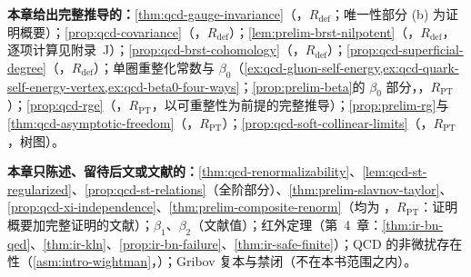 \begin{tcolorbox}[enhanced,breakable,title=本章证明了什么／没有证明什么,fonttitle=\bfseries,
  colback=gray!3!white,colframe=gray!55!black,boxrule=0.6pt,arc=2pt,
  left=5pt,right=5pt,top=3pt,bottom=3pt,before skip=6pt,after skip=6pt]
\textbf{本章给出完整推导的：}\cref{thm:qcd-gauge-invariance}（\tagR，$R_{\mathrm{def}}$；唯一性部分 (b) 为证明概要）；\cref{prop:qcd-covariance}（\tagR，$R_{\mathrm{def}}$）；\cref{lem:prelim-brst-nilpotent}（\tagR，$R_{\mathrm{def}}$，逐项计算见附录~J）；\cref{prop:qcd-brst-cohomology}（\tagR，$R_{\mathrm{def}}$）；\cref{prop:qcd-superficial-degree}（\tagR，$R_{\mathrm{def}}$）；单圈重整化常数与 $\beta_0$（\cref{ex:qcd-gluon-self-energy,ex:qcd-quark-self-energy-vertex,ex:qcd-beta0-four-ways}；\cref{prop:prelim-beta}的 $\beta_0$ 部分，\tagR，$R_{\mathrm{PT}}$）；\cref{prop:qcd-rge}（\tagR，$R_{\mathrm{PT}}$，以可重整性为前提的完整推导）；\cref{prop:prelim-rg}与\cref{thm:qcd-asymptotic-freedom}（\tagR，$R_{\mathrm{PT}}$）；\cref{prop:qcd-soft-collinear-limits}（\tagR，$R_{\mathrm{PT}}$，树图）。\par
\textbf{本章只陈述、留待后文或文献的：}\cref{thm:qcd-renormalizability}、\cref{lem:qcd-st-regularized}、\cref{prop:qcd-st-relations}（全阶部分）、\cref{thm:prelim-slavnov-taylor}、\cref{prop:qcd-xi-independence}、\cref{thm:prelim-composite-renorm}（均为 \tagR，$R_{\mathrm{PT}}$：证明概要加完整证明的文献）；$\beta_1$、$\beta_2$（文献值）；红外定理（第~4~章：\cref{thm:ir-bn-qed}、\cref{thm:ir-kln}、\cref{prop:ir-bn-failure}、\cref{thm:ir-safe-finite}）；QCD 的非微扰存在性（\cref{asm:intro-wightman}，\tagC）；Gribov 复本与禁闭（不在本书范围之内）。
\end{tcolorbox}

